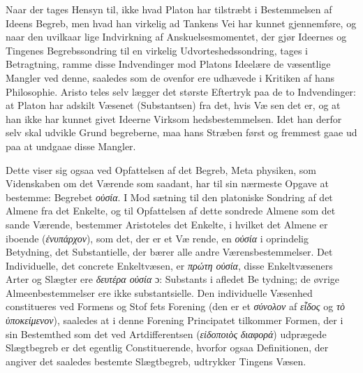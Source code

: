 \documentclass[12pt,a4paper]{book}
\newcommand{\gk}[1]{\textit{#1}}
\begin{document}
Naar der tages Hensyn til, ikke hvad Platon har tilstræbt
i Bestemmelsen af Ideens Begreb, men hvad han virkelig ad
Tankens Vei har kunnet gjennemføre, og naar den uvilkaar\-%
lige Indvirkning af Anskuelsesmomentet, der gjør Ideernes og
Tingenes Begrebssondring til en virkelig Udvorteshedssondring,
tages i Betragtning, ramme disse Indvendinger mod Platons
Ideelære de væsentlige Mangler ved denne, saaledes som de
ovenfor ere udhævede i Kritiken af hans Philosophie. Aristo\-%
teles selv lægger det største Eftertryk paa de to Indvendinger:
at Platon har adskilt Væsenet (Substantsen) fra det, hvis Væ\-%
sen det er, og at han ikke har kunnet givet Ideerne Virksom\-%
hedsbestemmelsen. Idet han derfor selv skal udvikle Grund\-%
begreberne, maa hans Stræben først og fremmest gaae ud paa
at undgaae disse Mangler.

Dette viser sig ogsaa ved Opfattelsen af det Begreb, Meta\-%
physiken, som Videnskaben om det Værende som saadant, har
til sin nærmeste Opgave at bestemme: Begrebet \gk{οὐσία}. I Mod\-%
sætning til den platoniske Sondring af det Almene fra det
Enkelte, og til Opfattelsen af dette sondrede Almene som det
sande Værende, bestemmer Aristoteles det Enkelte, i hvilket
det Almene er iboende (\gk{ἐνυπάρχον}), som det, der er et Væ\-%
rende, en \gk{οὐσία} i oprindelig Betydning, det Substantielle, der
bærer alle andre Værensbestemmelser. Det Individuelle, det
concrete Enkeltvæsen, er \gk{πρώτη οὐσία}, disse Enkeltvæseners
Arter og Slægter ere \gk{δευτέρα οὐσία} ɔ: Substants i afledet Be\-%
tydning; de øvrige Almeenbestemmelser ere ikke substantsielle.
Den individuelle Væsenhed constitueres ved Formens og Stof\-%
fets Forening (den er et \gk{σύνολον} af \gk{εἶδος} og \gk{τὸ ὑποκείμενον}),
saaledes at i denne Forening Principatet tilkommer Formen,
der i sin Bestemthed som det ved Artdifferentsen (\gk{εἰδοποιὸς}
\gk{διαφορά}) udprægede Slægtbegreb er det egentlig Constituerende,
hvorfor ogsaa Definitionen, der angiver det saaledes bestemte
Slægtbegreb, udtrykker Tingens Væsen.
\end{document}
